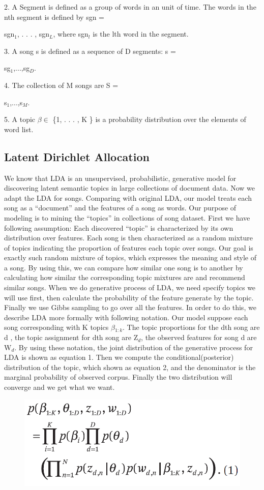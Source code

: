 \documentclass[10pt,twocolumn,letterpaper]{article}
\begin{document}
2. A Segment is defined as a  group of words in an unit of time. The words in the nth segment is defined by sgn = {sgn$_{1}$, . . . , sgn$_{L}$, where sgn$_{l}$ is the lth word in the segment.
\par
3. A song s is defined as a sequence of D segments: s = {sg$_{1}$,...,sg$_{D}$.
\par
4. The collection of M songs are S = {{s$_{1}$,...,s$_{M}$. 
\par
5. A topic $\beta \in$  \{1, . . . , K \} is a probability distribution over the elements of word list.  


\subsection{Latent Dirichlet Allocation}
We know that LDA is an unsupervised, probabilistic, generative model for discovering latent semantic topics in large collections of document data. Now we adapt the LDA for songs. Comparing with original LDA, our model treats each song as a “document” and the features of a song as words. Our purpose of modeling is to mining the “topics” in collections of song dataset.
First we have following assumption: Each discovered “topic” is characterized by its own distribution over features. Each song is then characterized as a random mixture of topics indicating the proportion of features each topic over songs\cite{lda}. Our goal is exactly such random mixture of topics, which expresses the meaning and style of a song. By using this, we can compare how similar one song is to another by calculating how similar the corresponding topic mixtures are and recommend similar songs.
 When we do generative process of LDA, we need specify topics we will use first, then calculate the probability of the feature generate by the topic. Finally we use Gibbs sampling to go over all the features. In order to do this, we describe LDA more formally with following notation. Our model suppose each song corresponding with K topics $\beta$$_{1:k}$. The topic proportions for the dth song are d , the topic assignment for dth song are Z$_{d}$, the observed features for song d are W$_{d}$. By using these notation, the joint distribution of the generative process for LDA is shown as equation 1. Then we compute the conditional(posterior) distribution of the topic, which shown as equation 2, and the denominator is the marginal probability of observed corpus. Finally the two distribution will converge and we get what we want. 
\begin{figure}[h]
            \includegraphics[width=.6\linewidth]{1.jpg}
            \label{fig:graph1}
        \end{figure}

}}}}
\end{document}
